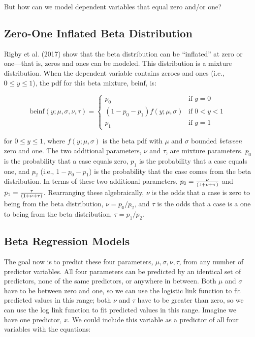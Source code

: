 \documentclass[english,man]{apa6}
\theoremstyle{definition}
\theoremstyle{definition}
\theoremstyle{remark}
\begin{document}
But how can we model dependent variables that equal zero and/or one?

\subsection{Zero-One Inflated Beta
Distribution}\label{zero-one-inflated-beta-distribution}

Rigby et al. (2017) show that the beta distribution can be
\enquote{inflated} at zero or one---that is, zeros and ones can be
modeled. This distribution is a mixture distribution. When the dependent
variable contains zeroes and ones (i.e., \(0 \leq y \leq 1\)), the pdf
for this beta mixture, \(\text{beinf}\), is:

\begin{center}
\[
\text{beinf}(y;\mu,\sigma,\nu,\tau) =
\begin{cases}
  p_0                             & \text{if } y = 0\\
  (1 - p_0 - p_1)f(y;\mu,\sigma)  & \text{if } 0 < y < 1\\
  p_1                             & \text{if } y = 1
\end{cases}
\]
\end{center}

for \(0 \leq y \leq 1\), where \(f(y;\mu,\sigma)\) is the beta pdf with
\(\mu\) and \(\sigma\) bounded \emph{between} zero and one. The two
additional parameters, \(\nu\) and \(\tau\), are mixture parameters.
\(p_0\) is the probability that a case equals zero, \(p_1\) is the
probability that a case equals one, and \(p_2\) (i.e.,
\(1 - p_0 - p_1\)) is the probability that the case comes from the beta
distribution. In terms of these two additional parameters,
\(p_0 = {\nu \over (1 + \nu + \tau)}\) and
\(p_1 = {\tau \over (1 + \nu + \tau)}\). Rearranging these
algebraically, \(\nu\) is the odds that a case is zero to being from the
beta distribution, \(\nu = p_0 / p_2\), and \(\tau\) is the odds that a
case is a one to being from the beta distribution, \(\tau = p_1 / p_2\).

\subsection{Beta Regression Models}\label{beta-regression-models}

The goal now is to predict these four parameters,
\(\mu, \sigma, \nu, \tau\), from any number of predictor variables. All
four parameters can be predicted by an identical set of predictors, none
of the same predictors, or anywhere in between. Both \(\mu\) and
\(\sigma\) have to be between zero and one, so we can use the logistic
link function to fit predicted values in this range; both \(\nu\) and
\(\tau\) have to be greater than zero, so we can use the log link
function to fit predicted values in this range. Imagine we have one
predictor, \(x\). We could include this variable as a predictor of all
four variables with the equations:
\end{document}
